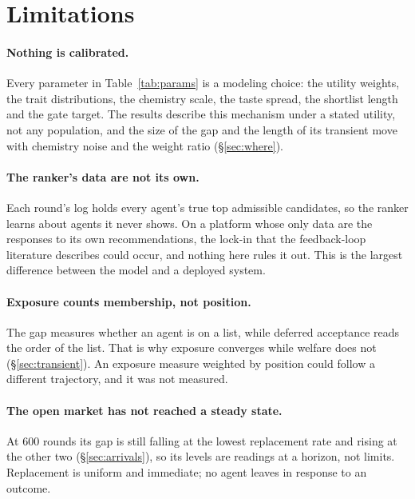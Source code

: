 
\section{Limitations}
\label{sec:limits}

\paragraph{Nothing is calibrated.} Every parameter in Table~\ref{tab:params} is a
modeling choice: the utility weights, the trait distributions, the chemistry
scale, the taste spread, the shortlist length and the gate target. The results
describe this mechanism under a stated utility, not any population, and the size
of the gap and the length of its transient move with chemistry noise and the
weight ratio (\S\ref{sec:where}).

\paragraph{The ranker's data are not its own.} Each round's log holds every
agent's true top admissible candidates, so the ranker learns about agents it never
shows. On a platform whose only data are the responses to its own
recommendations, the lock-in that the feedback-loop literature describes could
occur, and nothing here rules it out. This is the largest difference between the
model and a deployed system.

\paragraph{Exposure counts membership, not position.} The gap measures whether an
agent is on a list, while deferred acceptance reads the order of the list. That is
why exposure converges while welfare does not (\S\ref{sec:transient}). An
exposure measure weighted by position could follow a different trajectory, and it
was not measured.

\paragraph{The open market has not reached a steady state.} At 600 rounds its gap
is still falling at the lowest replacement rate and rising at the other two
(\S\ref{sec:arrivals}), so its levels are readings at a horizon, not limits.
Replacement is uniform and immediate; no agent leaves in response to an outcome.

